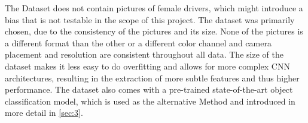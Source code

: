 \noindent
The Dataset does not contain pictures of female drivers, which might introduce a bias that is not testable in the scope of this project. The dataset was primarily chosen, due to the consistency of the pictures and its size. None of the pictures is a different format than the other or a different color channel and camera placement and resolution are consistent throughout all data. The size of the dataset makes it less easy to do overfitting and allows for more complex CNN architectures, resulting in the extraction of more subtle features and thus higher performance.
The dataset also comes with a pre-trained state-of-the-art object classification model, which is used as the alternative Method and introduced in more detail in \autoref{sec:3}.